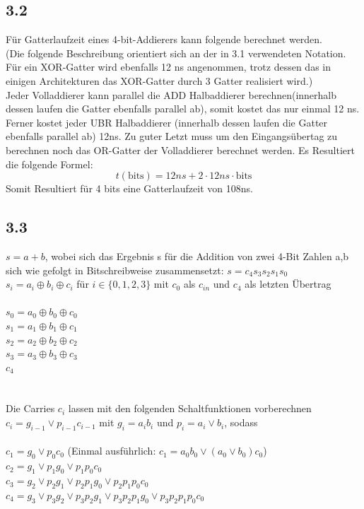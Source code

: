 \documentclass[12pt,a4paper]{scrartcl}
\begin{document}
	\subsection*{3.2}
		Für Gatterlaufzeit eines 4-bit-Addierers kann folgende berechnet werden.\\
		(Die folgende Beschreibung orientiert sich an der in 3.1 verwendeten Notation. Für ein XOR-Gatter wird ebenfalls 12 ns angenommen, trotz dessen das in einigen Architekturen das XOR-Gatter durch 3 Gatter realisiert wird.)\\
		Jeder Volladdierer kann parallel die ADD Halbaddierer berechnen(innerhalb dessen laufen die Gatter ebenfalls parallel ab), somit kostet das nur einmal 12 ns.\\
		Ferner kostet jeder UBR Halbaddierer (innerhalb dessen laufen die Gatter ebenfalls parallel ab) 12ns. Zu guter Letzt muss um den Eingangsübertag zu berechnen noch das OR-Gatter der Volladdierer berechnet werden. Es Resultiert die folgende Formel:
		\begin{equation}
			t(\text{bits}) = 12ns + 2\cdot 12ns\cdot \text{bits}
		\end{equation}
		Somit Resultiert für 4 bits eine Gatterlaufzeit von 108ns.
	\subsection*{3.3}
		$s = a + b$, wobei sich das Ergebnis s für die Addition von zwei 4-Bit Zahlen a,b sich wie gefolgt in Bitschreibweise zusammensetzt: $s = c_4 s_3s_2s_1s_0$ \\
		$s_i = a_i \oplus b_i \oplus c_i$ für $i \in \{0,1,2,3\}$ mit $c_0$ als $c_{in}$ und $c_4$ als letzten Übertrag \\
		\\
		$s_0 = a_0 \oplus b_0 \oplus c_0$ \\
		$s_1 = a_1 \oplus b_1 \oplus c_1$ \\
		$s_2 = a_2 \oplus b_2 \oplus c_2$ \\
		$s_3 = a_3 \oplus b_3 \oplus c_3$ \\
		$c_4$ \\
		\\
		\\
		Die Carries $c_i$ lassen mit den folgenden Schaltfunktionen vorberechnen \\
		$c_i = g_{i-1} \lor p_{i-1}c_{i-1}$ mit $g_i = a_ib_i$ und $p_i = a_i \lor b_i$, sodass \\
		\\
		$c_1 = g_0 \lor p_0c_0$  (Einmal ausführlich: $c_1 = a_0b_0 \lor (a_0 \lor b_0)c_0$)\\
		$c_2 = g_1 \lor p_1g_0 \lor p_1p_0c_0$ \\
		$c_3 = g_2 \lor p_2g_1 \lor p_2p_1g_0 \lor p_2p_1p_0c_0$ \\
		$c_4 = g_3 \lor p_3g_2 \lor p_3p_2g_1 \lor p_3p_2p_1g_0 \lor p_3p_2p_1p_0c_0$ \\
\end{document}
